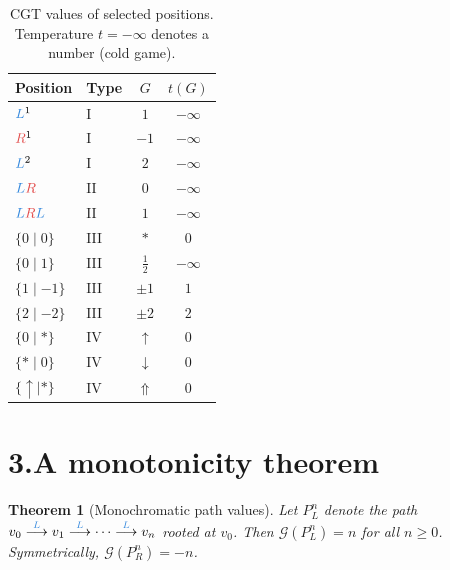 \documentclass[10pt,twocolumn]{article}
\theoremstyle{plain}
\newtheorem{theorem}{Theorem}
\theoremstyle{definition}
\theoremstyle{remark}
\newcommand{\Lopt}[1]{{\color{lblue}#1}}
\newcommand{\Ropt}[1]{{\color{rred}#1}}
\newcommand{\val}[1]{\mathcal{G}(#1)}
\newcommand{\edgeL}{\overset{\Lopt{L}}{\longrightarrow}}
\begin{document}
\begin{table}[h]
\centering
\small
\setlength{\tabcolsep}{4pt}
\caption{CGT values of selected positions. Temperature $t=-\infty$
  denotes a number (cold game).}
\label{tab:values}
\vspace{2pt}
\begin{tabular}{@{}llcc@{}}
\toprule
Position & Type & $G$ & $t(G)$ \\
\midrule
$\Lopt{L}^1$                 & I   & $1$             & $-\infty$ \\
$\Ropt{R}^1$                 & I   & $-1$            & $-\infty$ \\
$\Lopt{L}^2$                 & I   & $2$             & $-\infty$ \\
$\Lopt{L}\Ropt{R}$           & II  & $0$             & $-\infty$ \\
$\Lopt{L}\Ropt{R}\Lopt{L}$   & II  & $1$             & $-\infty$ \\
$\{0\mid 0\}$                & III & $*$             & $0$       \\
$\{0\mid 1\}$                & III & $\tfrac{1}{2}$  & $-\infty$ \\
$\{1\mid{-1}\}$              & III & $\pm 1$         & $1$       \\
$\{2\mid{-2}\}$              & III & $\pm 2$         & $2$       \\
$\{0\mid *\}$                & IV  & $\uparrow$      & $0$       \\
$\{*\mid 0\}$                & IV  & $\downarrow$    & $0$       \\
$\{\uparrow\mid *\}$         & IV  & $\Uparrow$      & $0$       \\
\bottomrule
\end{tabular}
\end{table}

\section{3.\enspace A monotonicity theorem}

\begin{theorem}[Monochromatic path values]\label{thm:mono}
Let $P^n_L$ denote the path $v_0\edgeL v_1\edgeL\cdots\edgeL v_n$ rooted
at $v_0$.  Then $\val{P^n_L}=n$ for all $n\ge 0$.
Symmetrically, $\val{P^n_R}=-n$.
\end{theorem}
\end{document}
